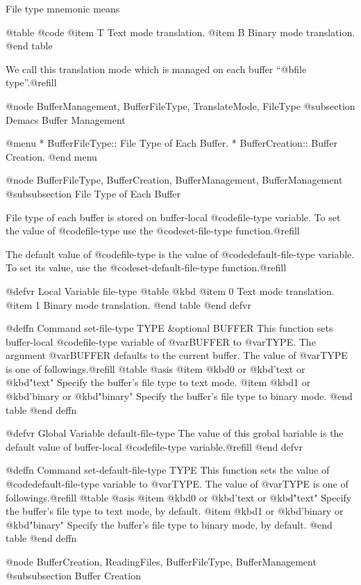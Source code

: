 File type mnemonic means

@table @code
@item T
Text mode translation.
@item B
Binary mode translation.
@end table

We call this translation mode which is managed on each buffer ``@b{file
type}''.@refill


@node BufferManagement, BufferFileType, TranslateMode, FileType
@subsection Demacs Buffer Management

@menu
* BufferFileType::  File Type of Each Buffer.
* BufferCreation::  Buffer Creation.
@end menu


@node BufferFileType, BufferCreation, BufferManagement, BufferManagement
@subsubsection File Type of Each Buffer

File type of each buffer is stored on buffer-local @code{file-type}
variable. To set the value of @code{file-type} use the
@code{set-file-type} function.@refill

The default value of @code{file-type} is the value of
@code{default-file-type} variable. To set its value, use the
@code{set-default-file-type} function.@refill

@defvr {Local Variable} file-type
@table @kbd
@item 0
Text mode translation.
@item 1
Binary mode translation.
@end table
@end defvr

@deffn Command set-file-type TYPE &optional BUFFER
This function sets buffer-local @code{file-type} variable of
@var{BUFFER} to @var{TYPE}. The argument @var{BUFFER} defaults to the
current buffer. The value of @var{TYPE} is one of followings.@refill
@table @asis
@item @kbd{0} or @kbd{'text} or @kbd{"text"}
Specify the buffer's file type to text mode.
@item @kbd{1} or @kbd{'binary} or @kbd{"binary"}
Specify the buffer's file type to binary mode.
@end table
@end deffn

@defvr {Global Variable} default-file-type
The value of this grobal bariable is the default value of buffer-local
@code{file-type} variable.@refill
@end defvr

@deffn Command set-default-file-type TYPE
This function sets the value of @code{default-file-type} variable to
@var{TYPE}. The value of @var{TYPE} is one of followings.@refill
@table @asis
@item @kbd{0} or @kbd{'text} or @kbd{"text"}
Specify the buffer's file type to text mode, by default.
@item @kbd{1} or @kbd{'binary} or @kbd{"binary"}
Specify the buffer's file type to binary mode, by default.
@end table
@end deffn


@node BufferCreation, ReadingFiles, BufferFileType, BufferManagement
@subsubsection Buffer Creation

